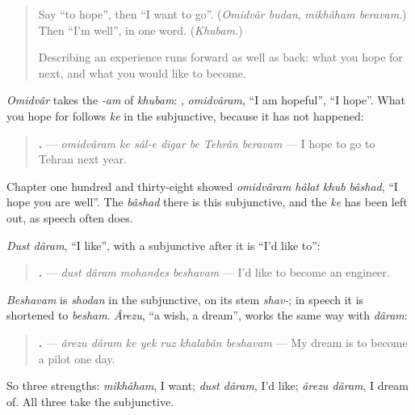 \label{lesson:FA-C296-omidvaram-ke}



\begin{quote}
Say \textquotedblleft{}to hope\textquotedblright{}, then \textquotedblleft{}I want to go\textquotedblright{}. (\emph{Omidvâr budan}, \emph{mikhâham beravam}.) Then \textquotedblleft{}I'm well\textquotedblright{}, in one word. (\emph{Khubam.})

Describing an experience runs forward as well as back: what you hope for next, and what you would like to become.
\end{quote}

\begin{grammarlens}[title={Grammar Lens: omidvâram ke, and the subjunctive}]
\emph{Omidvâr} takes the \emph{-am} of \emph{khubam}: \textbf{}, \emph{omidvâram}, \textquotedblleft{}I am hopeful\textquotedblright{}, \textquotedblleft{}I hope\textquotedblright{}. What you hope for follows \emph{ke} in the subjunctive, because it has not happened:

\begin{quote}
\textbf{      .} — \emph{omidvâram ke sâl-e digar be Tehrân beravam} — I hope to go to Tehran next year.
\end{quote}

Chapter one hundred and thirty-eight showed \emph{omidvâram hâlat khub bâshad}, \textquotedblleft{}I hope you are well\textquotedblright{}. The \emph{bâshad} there is this subjunctive, and the \emph{ke} has been left out, as speech often does.
\end{grammarlens}

\begin{grammarlens}[title={Grammar Lens: what you'd like, and what you dream of}]
\emph{Dust dâram}, \textquotedblleft{}I like\textquotedblright{}, with a subjunctive after it is \textquotedblleft{}I'd like to\textquotedblright{}:

\begin{quote}
\textbf{   .} — \emph{dust dâram mohandes beshavam} — I'd like to become an engineer.
\end{quote}

\emph{Beshavam} is \emph{shodan} in the subjunctive, on its stem \emph{shav-}; in speech it is shortened to \emph{besham}. \emph{Ârezu}, \textquotedblleft{}a wish, a dream\textquotedblright{}, works the same way with \emph{dâram}:

\begin{quote}
\textbf{      .} — \emph{ârezu dâram ke yek ruz khalabân beshavam} — My dream is to become a pilot one day.
\end{quote}

So three strengths: \emph{mikhâham}, I want; \emph{dust dâram}, I'd like; \emph{ârezu dâram}, I dream of. All three take the subjunctive.
\end{grammarlens}

